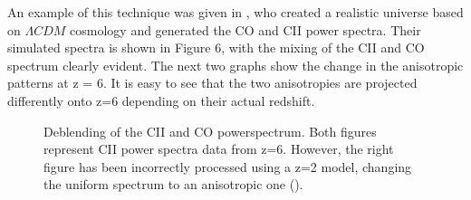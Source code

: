 \documentclass[manuscript]{aastex}
\begin{document}

An example of this technique was given in \cite{Cheng2016}, who created a realistic universe based on $\Lambda CDM$ cosmology and generated the CO and CII power spectra. Their simulated spectra is shown in Figure 6, with the mixing of the CII and CO spectrum clearly evident. The next two graphs show the change in the anisotropic patterns at z = 6. It is easy to see that the two anisotropies are projected differently onto z=6 depending on their actual redshift.

\begin{figure}[h!]
    \centering
    \qquad
    \singlespace
    \caption[Deblending of the CII and CO power spectrums. -(\cite{Cheng2016})]{Deblending of the CII and CO powerspectrum. Both figures represent CII power spectra data from z=6. However, the right figure has been incorrectly processed using a z=2 model, changing the uniform spectrum to an anisotropic one (\cite{Cheng2016}).}%
    \label{fig:cheng1}%
\end{figure}
\end{document}

